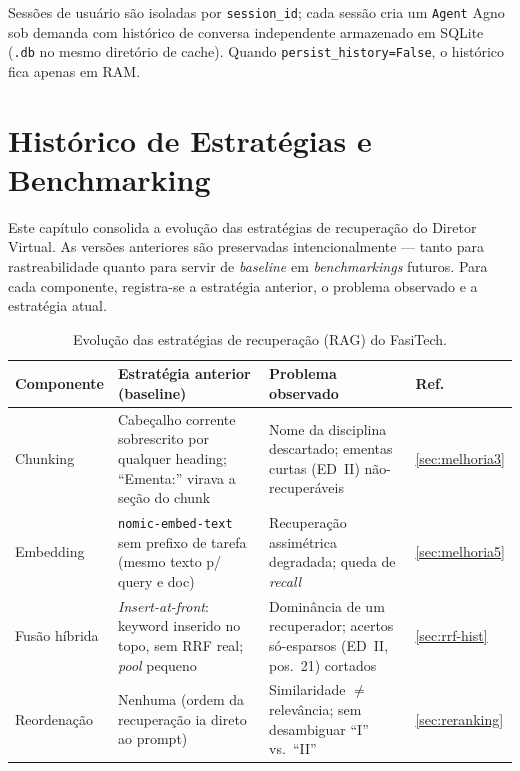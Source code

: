 \documentclass[12pt,a4paper]{report}
\begin{document}
Sessões de usuário são isoladas por \texttt{session\_id}; cada sessão
cria um \texttt{Agent} Agno sob demanda com histórico de conversa
independente armazenado em SQLite (\texttt{.db} no mesmo diretório de cache).
Quando \texttt{persist\_history=False}, o histórico fica apenas em RAM.

\chapter{Histórico de Estratégias e Benchmarking}

Este capítulo consolida a evolução das estratégias de recuperação do Diretor
Virtual. As versões anteriores são preservadas intencionalmente — tanto para
rastreabilidade quanto para servir de \emph{baseline} em \textit{benchmarkings}
futuros. Para cada componente, registra-se a estratégia anterior, o problema
observado e a estratégia atual.

\begin{table}[H]
\centering
\caption{Evolução das estratégias de recuperação (RAG) do FasiTech.}
\label{tab:historico}
\small
\begin{tabularx}{\textwidth}{p{2.4cm}XXp{0.9cm}}
\toprule
\textbf{Componente} & \textbf{Estratégia anterior (baseline)} &
\textbf{Problema observado} & \textbf{Ref.} \\
\midrule
Chunking &
Cabeçalho corrente sobrescrito por qualquer heading; ``Ementa:'' virava a
seção do chunk &
Nome da disciplina descartado; ementas curtas (ED~II) não-recuperáveis &
\ref{sec:melhoria3} \\
\addlinespace
Embedding &
\texttt{nomic-embed-text} sem prefixo de tarefa (mesmo texto p/ query e doc) &
Recuperação assimétrica degradada; queda de \textit{recall} &
\ref{sec:melhoria5} \\
\addlinespace
Fusão híbrida &
\textit{Insert-at-front}: keyword inserido no topo, sem RRF real; \textit{pool}
pequeno &
Dominância de um recuperador; acertos só-esparsos (ED~II, pos.~21) cortados &
\ref{sec:rrf-hist} \\
\addlinespace
Reordenação &
Nenhuma (ordem da recuperação ia direto ao prompt) &
Similaridade $\neq$ relevância; sem desambiguar ``I'' vs.\ ``II'' &
\ref{sec:reranking} \\
\bottomrule
\end{tabularx}
\end{table}
\end{document}
